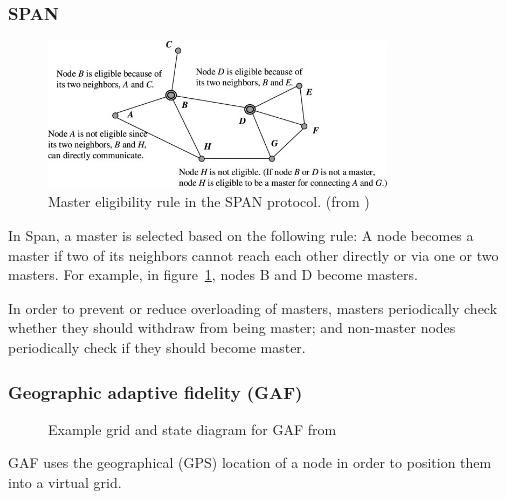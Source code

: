 \documentclass[conference]{IEEEtran}
\begin{document}
\subsubsection{SPAN}
\begin{figure}
\centering
\includegraphics[width=0.8\textwidth]{images/span-master-example}
\caption{Master eligibility rule in the SPAN protocol. (from \cite{alotaibi2012survey})}
\label{spanmaster}
\end{figure}
In Span\cite{chen2002span}, a master is selected based on the following rule:
A node becomes a master if two of its neighbors cannot reach each other directly
or via one or two masters. For example, in figure~\ref{spanmaster}, nodes B and
D become masters.

In order to prevent or reduce overloading of masters, masters periodically
check whether they should withdraw from being master; and non-master nodes
periodically check if they should become master.


\subsubsection{Geographic adaptive fidelity (GAF)}
\begin{figure}[!t]
\hfill
{}
\caption{Example grid and state diagram for GAF from \cite{alotaibi2012survey}}
\end{figure}
GAF\cite{xu2001geography} uses the geographical (GPS) location of a node in
order to position them into a virtual grid.
\end{document}

